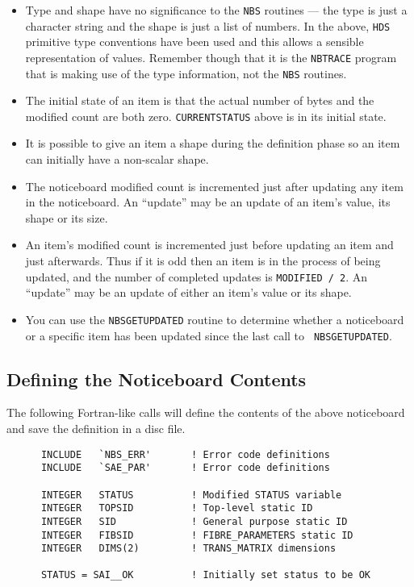 \documentclass[twoside,11pt]{article}
\renewcommand{\_}{\texttt{\symbol{95}}}
\begin{document}
\begin {itemize}
\item Type and shape have no significance to the {\tt NBS} routines --- the type
is just a character string and the shape is just a list of numbers. In the
above, {\tt HDS} primitive type conventions have been used and this allows a
sensible representation of values. Remember though that it is the {\tt NBTRACE}
program that is making use of the type information, not the {\tt NBS} routines.
\item The initial state of an item is that the actual number of bytes and the
modified count are both zero. {\tt CURRENT\_STATUS} above is in its initial
state.
\item It is possible to give an item a shape during the definition phase so an
item can initially have a non-scalar shape.
\item The noticeboard modified count is incremented just after updating any
item in the noticeboard. An ``update'' may be an update of an item's value, its
shape or its size.
\item An item's modified count is incremented just before updating an item
and just afterwards. Thus if it is odd then an item is in the process of
being updated, and the number of completed updates is {\tt MODIFIED~/~2}. An
``update'' may be an update of either an item's value or its shape.
\item You can use the {\tt NBS\_GET\_UPDATED} routine to determine whether
a noticeboard or a specific item has been updated since the last call to {\tt
NBS\_GET\_UPDATED}.
\end {itemize}

\subsection {Defining the Noticeboard Contents}

The following Fortran-like calls will define the contents of the above
noticeboard and save the definition in a disc file.

\begin {verbatim}
      INCLUDE   `NBS_ERR'       ! Error code definitions
      INCLUDE   `SAE_PAR'       ! Error code definitions

      INTEGER   STATUS          ! Modified STATUS variable
      INTEGER   TOPSID          ! Top-level static ID
      INTEGER   SID             ! General purpose static ID
      INTEGER   FIBSID          ! FIBRE_PARAMETERS static ID
      INTEGER   DIMS(2)         ! TRANS_MATRIX dimensions

      STATUS = SAI__OK          ! Initially set status to be OK
\end{verbatim}
\end{document}

